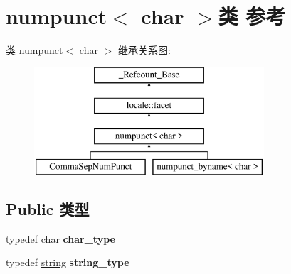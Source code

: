\hypertarget{classnumpunct_3_01char_01_4}{}\section{numpunct$<$ char $>$类 参考}
\label{classnumpunct_3_01char_01_4}
类 numpunct$<$ char $>$ 继承关系图\+:\begin{figure}[H]
\begin{center}
\leavevmode
\includegraphics[height=4.000000cm]{classnumpunct_3_01char_01_4}
\end{center}
\end{figure}
\subsection*{Public 类型}
\begin{DoxyCompactItemize}
\item 
\mbox{\label{classnumpunct_3_01char_01_4_adfaf7cd8aa3577b7ed72c966def81470}} 
typedef char {\bfseries char\+\_\+type}
\item 
\mbox{\label{classnumpunct_3_01char_01_4_a1d980d94b7311de1010a4295af406e99}} 
typedef \hyperlink{structstring}{string} {\bfseries string\+\_\+type}
\end{DoxyCompactItemize}

